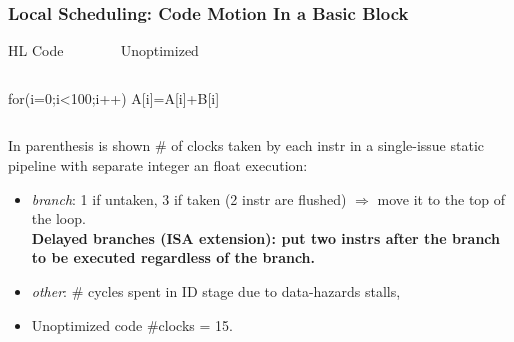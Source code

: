 \documentclass{beamer}
\newcommand{\emp}[1]{\textcolor{DikuRed}{ #1}}
\begin{document}
\begin{frame}[fragile,t]
    \frametitle{Local Scheduling: Code Motion In a Basic Block}

\begin{block}{HL Code{\tt~~~~~~~~}Unoptimized}\vspace{-2ex}
\begin{columns}
\begin{colorcode}[fontsize=\scriptsize]
for(i=0;i<100;i++)
  A[i]=A[i]+B[i]
\end{colorcode} 
\begin{colorcode}[fontsize=\scriptsize]

\end{colorcode} 
\end{columns}
\end{block}

In parenthesis is shown \# of clocks taken by each instr
in a single-issue static pipeline with separate integer an float 
execution:\smallskip
\begin{itemize}
    \item {\em branch}: 1 if untaken, 3 if taken (2 instr are flushed) $\Rightarrow$ 
            move it to the top of the loop.\\  
            \emp{\bf Delayed branches (ISA extension): put two instrs
            after the branch to be executed regardless of the branch.}
    \item {\em other}: \# cycles spent in ID stage due to data-hazards stalls,
    \item Unoptimized code \#clocks = 15.
\end  {itemize}

\end{frame}
\end{document}
